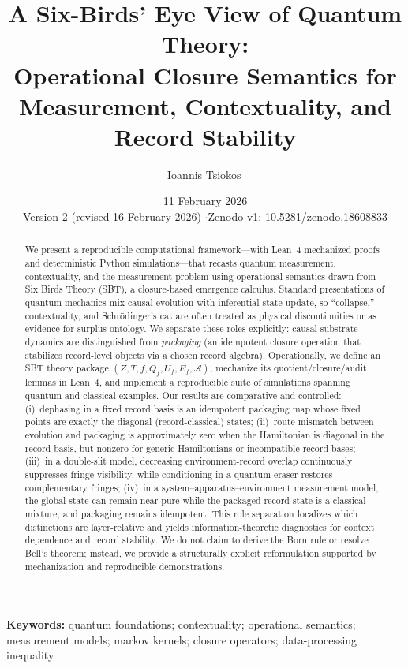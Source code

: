 \documentclass[11pt]{article}
\title{A Six-Birds' Eye View of Quantum Theory:\\Operational Closure Semantics for Measurement, Contextuality, and Record Stability}
\author{Ioannis Tsiokos\,\orcidlink{0009-0009-7659-5964}}
\affiliation{}
\date{11 February 2026\\[4pt]{\small Version 2 (revised 16 February 2026) \quad$\cdot$\quad Zenodo v1: \href{https://doi.org/10.5281/zenodo.18608833}{10.5281/zenodo.18608833}}}
\makeatletter
\newcommand{\printaffiliation}{\begin{center}\small \@affiliation\end{center}}
\makeatother
\begin{document}
\maketitle
\thispagestyle{firstpage}
\printaffiliation
\begin{abstract}
We present a reproducible computational framework---with Lean~4 mechanized proofs and deterministic Python simulations---that recasts quantum measurement, contextuality, and the measurement problem using operational semantics drawn from Six Birds Theory (SBT), a closure-based emergence calculus. Standard presentations of quantum mechanics mix causal evolution with inferential state update, so ``collapse,'' contextuality, and Schr\"odinger's cat are often treated as physical discontinuities or as evidence for surplus ontology. We separate these roles explicitly: causal substrate dynamics are distinguished from \emph{packaging} (an idempotent closure operation that stabilizes record-level objects via a chosen record algebra). Operationally, we define an SBT theory package $(Z,T,f,Q_f,U_f,E_f,\mathcal{A})$, mechanize its quotient/closure/audit lemmas in Lean~4, and implement a reproducible suite of simulations spanning quantum and classical examples. Our results are comparative and controlled: (i)~dephasing in a fixed record basis is an idempotent packaging map whose fixed points are exactly the diagonal (record-classical) states; (ii)~route mismatch between evolution and packaging is approximately zero when the Hamiltonian is diagonal in the record basis, but nonzero for generic Hamiltonians or incompatible record bases; (iii)~in a double-slit model, decreasing environment-record overlap continuously suppresses fringe visibility, while conditioning in a quantum eraser restores complementary fringes; (iv)~in a system--apparatus--environment measurement model, the global state can remain near-pure while the packaged record state is a classical mixture, and packaging remains idempotent. This role separation localizes which distinctions are layer-relative and yields information-theoretic diagnostics for context dependence and record stability. We do not claim to derive the Born rule or resolve Bell's theorem; instead, we provide a structurally explicit reformulation supported by mechanization and reproducible demonstrations.
\end{abstract}

\vspace{1ex}
\noindent\textbf{Keywords:} quantum foundations; contextuality; operational semantics; measurement models; markov kernels; closure operators; data-processing inequality
\end{document}
